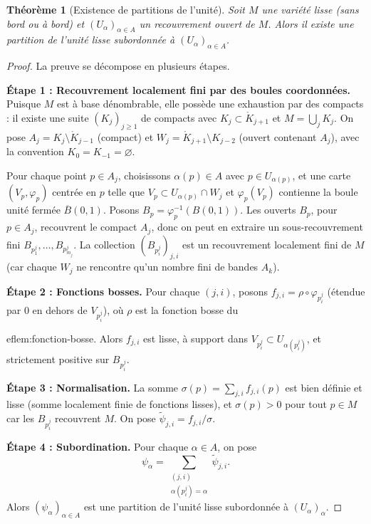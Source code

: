 \documentclass[12pt,a4paper,openany]{book}
\theoremstyle{definition}
\theoremstyle{plain}
\newtheorem{theoreme}[definition]{Théorème}
\theoremstyle{remark}
\begin{document}
\begin{theoreme}[Existence de partitions de l'unité]\label{thm:partition-unite}
Soit $M$ une variété lisse (sans bord ou à bord) et $(U_\alpha)_{\alpha \in A}$
un recouvrement ouvert de $M$. Alors il existe une partition de l'unité lisse
subordonnée à $(U_\alpha)_{\alpha \in A}$.
\end{theoreme}

\begin{proof}
La preuve se décompose en plusieurs étapes.

\textbf{Étape 1 : Recouvrement localement fini par des boules coordonnées.}
Puisque $M$ est à base dénombrable, elle possède une exhaustion par des
compacts : il existe une suite $(K_j)_{j \geq 1}$ de compacts avec $K_j
\subset \mathring{K}_{j+1}$ et $M = \bigcup_j K_j$. On pose $A_j =
K_j \setminus \mathring{K}_{j-1}$ (compact) et $W_j = \mathring{K}_{j+1}
\setminus K_{j-2}$ (ouvert contenant $A_j$), avec la convention $K_0 =
K_{-1} = \varnothing$.

Pour chaque point $p \in A_j$, choisissons $\alpha(p) \in A$ avec $p \in
U_{\alpha(p)}$, et une carte $(V_p, \varphi_p)$ centrée en $p$ telle que
$V_p \subset U_{\alpha(p)} \cap W_j$ et $\varphi_p(V_p)$ contienne la boule
unité fermée $\overline{B}(0, 1)$. Posons $B_p = \varphi_p^{-1}(B(0, 1))$.
Les ouverts $B_p$, pour $p \in A_j$, recouvrent le compact $A_j$, donc on
peut en extraire un sous-recouvrement fini $B_{p_1^j}, \ldots, B_{p_{m_j}^j}$.
La collection $(B_{p_i^j})_{j, i}$ est un recouvrement localement fini de $M$
(car chaque $W_j$ ne rencontre qu'un nombre fini de bandes $A_k$).

\textbf{Étape 2 : Fonctions bosses.}
Pour chaque $(j, i)$, posons $f_{j,i} = \rho \circ \varphi_{p_i^j}$ (étendue
par $0$ en dehors de $V_{p_i^j}$), où $\rho$ est la fonction bosse du

ef{lem:fonction-bosse}. Alors $f_{j,i}$ est lisse, à support dans $V_{p_i^j}
\subset U_{\alpha(p_i^j)}$, et strictement positive sur $B_{p_i^j}$.

\textbf{Étape 3 : Normalisation.}
La somme $\sigma(p) = \sum_{j,i} f_{j,i}(p)$ est bien définie et lisse (somme
localement finie de fonctions lisses), et $\sigma(p) > 0$ pour tout $p \in M$
car les $B_{p_i^j}$ recouvrent $M$. On pose $\widetilde{\psi}_{j,i} =
f_{j,i} / \sigma$.

\textbf{Étape 4 : Subordination.}
Pour chaque $\alpha \in A$, on pose
\[
    \psi_\alpha = \sum_{\substack{(j,i) \\ \alpha(p_i^j) = \alpha}}
    \widetilde{\psi}_{j,i}.
\]
Alors $(\psi_\alpha)_{\alpha \in A}$ est une partition de l'unité lisse
subordonnée à $(U_\alpha)_\alpha$.
\end{proof}
\end{document}
